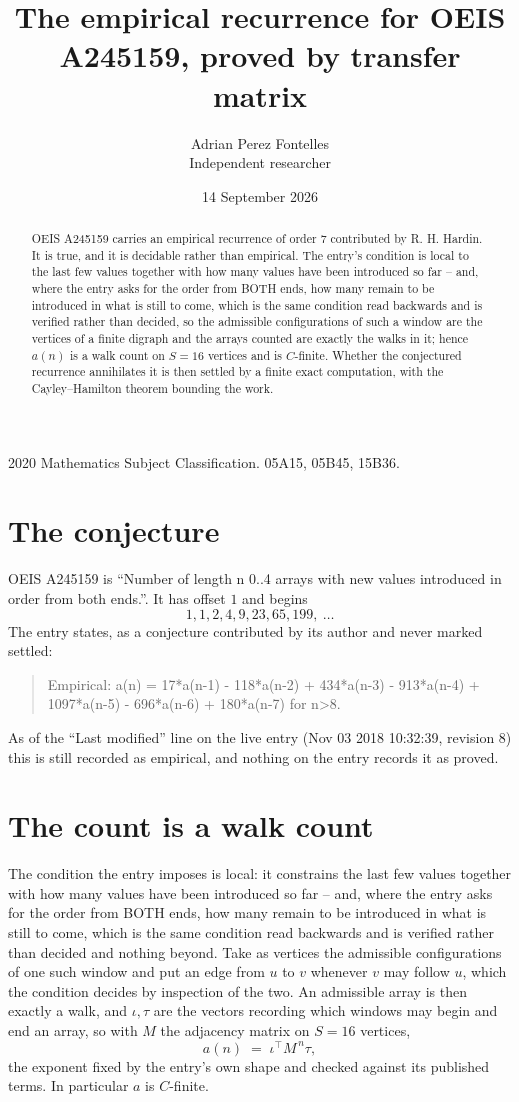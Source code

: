 \documentclass[11pt,a4paper]{article}
\title{The empirical recurrence for OEIS A245159, proved by transfer matrix}
\author{Adrian Perez Fontelles\\ \small Independent researcher}
\date{14 September 2026}
\theoremstyle{plain}
\theoremstyle{definition}
\begin{document}
\maketitle

\begin{abstract}
OEIS A245159 carries an empirical recurrence of order $7$ contributed by R. H. Hardin. It is
true, and it is decidable rather than empirical. The entry's condition is local to the last few values together with how many values have been introduced so far -- and, where the entry asks for the order from BOTH ends, how many remain to be introduced in what is still to come, which is the same condition read backwards and is verified rather than decided, so
the admissible configurations of such a window are the vertices of a finite digraph and the
arrays counted are exactly the walks in it; hence $a(n)$ is a walk count on $S=16$ vertices
and is $C$-finite. Whether the conjectured recurrence annihilates it is then settled by a
finite exact computation, with the Cayley--Hamilton theorem bounding the work.
\end{abstract}

\noindent\small 2020 Mathematics Subject Classification. 05A15, 05B45, 15B36.\normalsize

\section{The conjecture}

OEIS A245159 is ``Number of length n 0..4 arrays with new values introduced in order from both ends.''. It has offset $1$ and begins
\[
1, 1, 2, 4, 9, 23, 65, 199,\ \dots
\]
The entry states, as a conjecture contributed by its author and never marked settled:
\begin{quote}
Empirical: a(n) = 17*a(n-1) - 118*a(n-2) + 434*a(n-3) - 913*a(n-4) + 1097*a(n-5) - 696*a(n-6) + 180*a(n-7) for n>8.
\end{quote}
As of the ``Last modified'' line on the live entry (Nov 03 2018 10:32:39, revision 8) this is still
recorded as empirical, and nothing on the entry records it as proved.

\section{The count is a walk count}

The condition the entry imposes is local: it constrains the last few values together with how many values have been introduced so far -- and, where the entry asks for the order from BOTH ends, how many remain to be introduced in what is still to come, which is the same condition read backwards and is verified rather than decided and nothing beyond. Take as vertices the admissible configurations of one such window and put an edge from $u$ to $v$ whenever $v$ may follow $u$, which the condition decides by inspection of the two.
An admissible array is then exactly a walk, and $\iota,\tau$ are the vectors recording which windows may begin and end an array, so with $M$ the adjacency matrix on $S=16$ vertices,
\[
a(n)\;=\;\iota^{\!\top}M^{\,n}\tau ,
\]
the exponent fixed by the entry's own shape and checked against its published terms. In
particular $a$ is $C$-finite.
\end{document}

